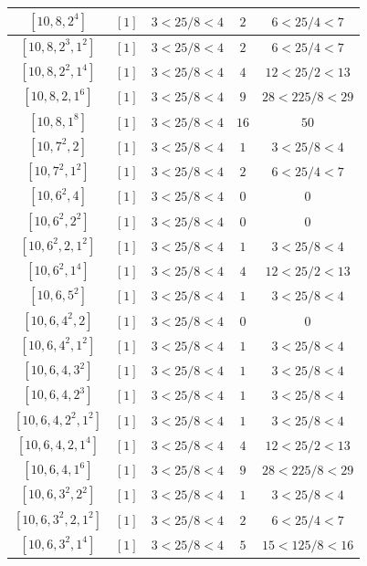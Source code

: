 \documentclass{article}%
\begin{document}
\begin{center}
\begin{longtable}{||c|c|c|c|c||}
$[10, 8, 2^{4}]$ & $[1]$ & $3 < 25/8 < 4$ & $2$ & $6 < 25/4 < 7$ \\ \hline 
$[10, 8, 2^{3}, 1^{2}]$ & $[1]$ & $3 < 25/8 < 4$ & $2$ & $6 < 25/4 < 7$ \\ \hline 
$[10, 8, 2^{2}, 1^{4}]$ & $[1]$ & $3 < 25/8 < 4$ & $4$ & $12 < 25/2 < 13$ \\ \hline 
$[10, 8, 2, 1^{6}]$ & $[1]$ & $3 < 25/8 < 4$ & $9$ & $28 < 225/8 < 29$ \\ \hline 
$[10, 8, 1^{8}]$ & $[1]$ & $3 < 25/8 < 4$ & $16$ & $50$ \\ \hline 
$[10, 7^{2}, 2]$ & $[1]$ & $3 < 25/8 < 4$ & $1$ & $3 < 25/8 < 4$ \\ \hline 
$[10, 7^{2}, 1^{2}]$ & $[1]$ & $3 < 25/8 < 4$ & $2$ & $6 < 25/4 < 7$ \\ \hline 
$[10, 6^{2}, 4]$ & $[1]$ & $3 < 25/8 < 4$ & $0$ & $0$ \\ \hline 
$[10, 6^{2}, 2^{2}]$ & $[1]$ & $3 < 25/8 < 4$ & $0$ & $0$ \\ \hline 
$[10, 6^{2}, 2, 1^{2}]$ & $[1]$ & $3 < 25/8 < 4$ & $1$ & $3 < 25/8 < 4$ \\ \hline 
$[10, 6^{2}, 1^{4}]$ & $[1]$ & $3 < 25/8 < 4$ & $4$ & $12 < 25/2 < 13$ \\ \hline 
$[10, 6, 5^{2}]$ & $[1]$ & $3 < 25/8 < 4$ & $1$ & $3 < 25/8 < 4$ \\ \hline 
$[10, 6, 4^{2}, 2]$ & $[1]$ & $3 < 25/8 < 4$ & $0$ & $0$ \\ \hline 
$[10, 6, 4^{2}, 1^{2}]$ & $[1]$ & $3 < 25/8 < 4$ & $1$ & $3 < 25/8 < 4$ \\ \hline 
$[10, 6, 4, 3^{2}]$ & $[1]$ & $3 < 25/8 < 4$ & $1$ & $3 < 25/8 < 4$ \\ \hline 
$[10, 6, 4, 2^{3}]$ & $[1]$ & $3 < 25/8 < 4$ & $1$ & $3 < 25/8 < 4$ \\ \hline 
$[10, 6, 4, 2^{2}, 1^{2}]$ & $[1]$ & $3 < 25/8 < 4$ & $1$ & $3 < 25/8 < 4$ \\ \hline 
$[10, 6, 4, 2, 1^{4}]$ & $[1]$ & $3 < 25/8 < 4$ & $4$ & $12 < 25/2 < 13$ \\ \hline 
$[10, 6, 4, 1^{6}]$ & $[1]$ & $3 < 25/8 < 4$ & $9$ & $28 < 225/8 < 29$ \\ \hline 
$[10, 6, 3^{2}, 2^{2}]$ & $[1]$ & $3 < 25/8 < 4$ & $1$ & $3 < 25/8 < 4$ \\ \hline 
$[10, 6, 3^{2}, 2, 1^{2}]$ & $[1]$ & $3 < 25/8 < 4$ & $2$ & $6 < 25/4 < 7$ \\ \hline 
$[10, 6, 3^{2}, 1^{4}]$ & $[1]$ & $3 < 25/8 < 4$ & $5$ & $15 < 125/8 < 16$ \\ \hline 

\end{longtable}
\end{center}
\end{document}
